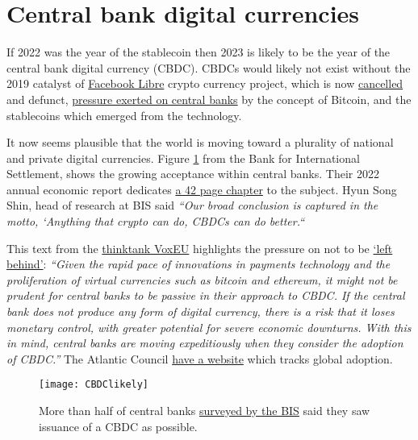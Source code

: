 \section{Central bank digital currencies}
If 2022 was the year of the stablecoin then 2023 is likely to be the year of the central bank digital currency (CBDC). CBDCs would likely not exist without the 2019 catalyst of \href{https://www.thetimes.co.uk/article/facebooks-libra-cryptocurrency-project-ends-in-failure-cxvnnc3kx}{Facebook Libre} crypto currency project, which is now \href{https://fortune.com/2022/07/01/meta-novi-crypto-payments-wallet-end-september-2022/}{cancelled} and defunct, \href{https://www.theguardian.com/world/2021/jul/09/currency-and-control-why-china-wants-to-undermine-bitcoin}{pressure exerted on central banks} by the concept of Bitcoin, and the stablecoins which emerged from the technology.\par
It now seems plausible that the world is moving toward a plurality of national and private digital currencies. Figure \ref{fig:CBDClikely} from the Bank for International Settlement, shows the growing acceptance within central banks. Their 2022 annual economic report dedicates \href{https://www.bis.org/publ/arpdf/ar2022e3.pdf}{a 42 page chapter} to the subject. Hyun Song Shin, head of research at BIS said \textit{``Our broad conclusion is captured in the motto, ‘Anything that crypto can do, CBDCs can do better.``}\par
This text from the \href{https://voxeu.org/article/benefits-central-bank-digital-currency}{thinktank VoxEU} highlights the pressure on not to be \href{https://himes.house.gov/u-s-central-bank-digital-currency}{`left behind'}: \textit{``Given the rapid pace of innovations in payments technology and the proliferation of virtual currencies such as bitcoin and ethereum, it might not be prudent for central banks to be passive in their approach to CBDC. If the central bank does not produce any form of digital currency, there is a risk that it loses monetary control, with greater potential for severe economic downturns. With this in mind, central banks are moving expeditiously when they consider the adoption of CBDC.''} The Atlantic Council \href{https://www.atlanticcouncil.org/cbdctracker/}{have a website} which tracks global adoption.\par\par
\begin{figure}
  \centering
    \texttt{[image: CBDClikely]}
  \caption{More than half of central banks \href{https://www.bis.org/publ/bppdf/bispap125.htm}{surveyed by the BIS} said they saw issuance of a CBDC as possible.}
  \label{fig:CBDClikely}
\end{figure}
